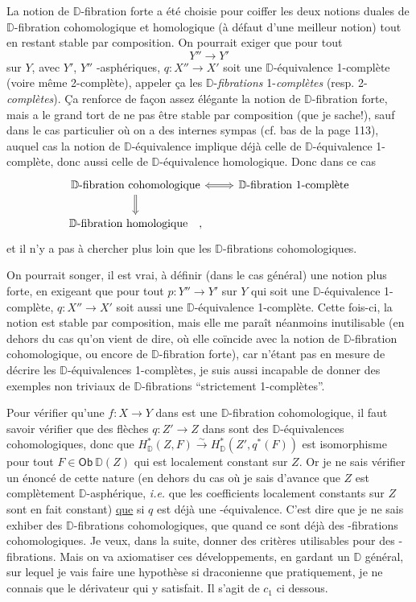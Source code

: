 \documentclass[11pt,leqno]{article}
\newcommand{\printedpage}[1]{\marginpar{\footnotesize p.~#1}}
\newcommand{\msp}[1]{\marginpar{\footnotesize [#1]}}
\newcommand{\Dia}{\mathsf{Dia}}
\newcommand{\Ob}{\mathsf{Ob}}
\newcommand{\Hom}{\mathsf{Hom}}
\newcommand{\Hot}{\mathsf{Hot}}
\newcommand{\HOT}{\mathsf{HOT}}
\newcommand{\D}{\mathbb{D}}
\begin{document}
\msp{page 122}La notion de $\D$-fibration forte a été choisie pour coiffer les deux notions duales de $\D$-fibration cohomologique et homologique (à défaut d'une meilleur notion) tout en restant stable par composition. On pourrait exiger que pour tout %
\[
Y'' \longrightarrow Y'
\]
sur $Y$, avec $Y'$, $Y''$ \Hot-asphériques, $q : X'' \to X'$ soit une $\D$-équivalence 1-complète (voire même 2-complète), appeler ça les $\D$-\textit{fibrations} 1-\textit{complètes} (resp. 2-\textit{complètes}). Ça renforce de façon assez élégante la notion de $\D$-fibration forte, mais a le grand tort de ne pas être stable par composition (que je sache!), sauf dans le cas particulier où on a des \underline{\Hom} internes sympas (cf. bas de la page 113), auquel cas la notion de $\D$-équivalence implique déjà celle de $\D$-équivalence 1-complète,
\printedpage{73}
\msp{page 123}donc aussi celle de $\D$-équivalence homologique. Donc dans ce cas
\[
\begin{tikzcd}
\text{$\D$-fibration cohomologique} \arrow[r, Leftrightarrow] \arrow[d, Rightarrow] & \text{$\D$-fibration 1-complète} \\
\text{$\D$-fibration homologique} \quad , &
\end{tikzcd}
\]
et il n'y a pas à chercher plus loin que les $\D$-fibrations cohomologiques.

On pourrait songer, il est vrai, à définir (dans le cas général) une notion plus forte, en exigeant que pour tout $p : Y'' \to Y'$ sur $Y$ qui soit une $\D$-équivalence 1-complète, $q : X'' \to X'$ soit aussi une $\D$-équivalence 1-complète. Cette fois-ci, la notion est stable par composition, mais elle me paraît néanmoins inutilisable (en dehors du cas qu'on vient de dire, où elle coïncide avec la notion de $\D$-fibration cohomologique, ou encore de $\D$-fibration forte), car n'étant pas en mesure de décrire les $\D$-équivalences 1-complètes, je suis aussi incapable de donner des exemples non triviaux de $\D$-fibrations “strictement 1-complètes”.

Pour vérifier qu'une $f : X \to Y$ dans \Dia{} est une $\D$-fibration cohomologique, il faut
\msp{page 124}savoir vérifier que des flèches $q : Z' \to Z$ dans \Dia{} sont des $\D$-équivalences cohomologiques, donc que $H^*_{\D}(Z,F) \overset{\sim}{\rightarrow} H^*_{\D}(Z',q^*(F))$ est isomorphisme pour tout $F \in \Ob\ \D(Z)$ qui est localement constant sur $Z$. Or je ne sais vérifier un énoncé de cette nature (en dehors du cas où je sais d'avance que $Z$ est complètement $\D$-asphérique, \textit{i.e.} que les coefficients localement constants sur $Z$ sont en fait constant) \underline{que} si $q$ est déjà une \Hot-équivalence. %
C'est dire que je ne sais exhiber des $\D$-fibrations cohomologiques, que quand ce sont déjà des \HOT-fibrations cohomologiques. Je veux, dans la suite, donner des critères utilisables pour des \HOT-fibrations. Mais on va axiomatiser ces développements, en gardant un $\D$ général, sur lequel je vais faire une hypothèse si draconienne que pratiquement, je ne connais que le dérivateur \HOT{} qui y satisfait. Il s'agit de $c_1$ ci dessous.
\end{document}

